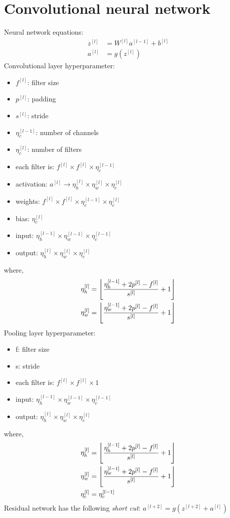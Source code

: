 \documentclass{book}
\DeclarePairedDelimiter\floor{\lfloor}{\rfloor}
\begin{document}
\chapter{Convolutional neural network}
Neural network equations:
\begin{align*}
z^{[l]} &= W^{[l]}a^{[l-1]} + b^{[l]} \\
a^{[l]} &= g(z^{[l]})
\end{align*}
Convolutional layer hyperparameter:
\begin{itemize}\addtolength{\itemsep}{-0.5\baselineskip}
\item $f^{[l]}$: filter size
\item $p^{[l]}$: padding
\item $s^{[l]}$: stride
\item $\eta_c^{[l-1]}$: number of channels
\item $\eta_c^{[l]}$: number of filters
\item each filter is: $f^{[l]} \times f^{[l]} \times \eta_c^{[l-1]}$
\item activation: $a^{[l]} \rightarrow \eta_h^{[l]} \times \eta_w^{[l]} \times \eta_c^{[l]}$
\item weights: $f^{[l]} \times f^{[l]} \times \eta_c^{[l-1]} \times \eta_c^{[l]}$
\item bias: $\eta_c^{[l]}$
\item input: $\eta_h^{[l-1]} \times \eta_w^{[l-1]} \times \eta_c^{[l-1]}$
\item output: $\eta_h^{[l]} \times \eta_w^{[l]} \times \eta_c^{[l]}$
\end{itemize}
where,
\begin{align*}
\eta_h^{[l]} &= \floor*{\frac{\eta_h^{[l-1]} + 2p^{[l]} - f^{[l]}}{s^{[l]}} + 1} \\
\eta_w^{[l]} &= \floor*{\frac{\eta_w^{[l-1]} + 2p^{[l]} - f^{[l]}}{s^{[l]}} + 1}
\end{align*}
Pooling layer hyperparameter:
\begin{itemize}\addtolength{\itemsep}{-0.5\baselineskip}
\item f: filter size
\item s: stride
\item each filter is: $f^{[l]} \times f^{[l]} \times 1$
\item input: $\eta_h^{[l-1]} \times \eta_w^{[l-1]} \times \eta_c^{[l-1]}$
\item output: $\eta_h^{[l]} \times \eta_w^{[l]} \times \eta_c^{[l]}$
\end{itemize}
where,
\begin{align*}
\eta_h^{[l]} &= \floor*{\frac{\eta_h^{[l-1]} + 2p^{[l]} - f^{[l]}}{s^{[l]}} + 1} \\
\eta_w^{[l]} &= \floor*{\frac{\eta_w^{[l-1]} + 2p^{[l]} - f^{[l]}}{s^{[l]}} + 1} \\
\eta_c^{[l]} &= \eta_c^{[l-1]}
\end{align*}
Residual network has the following \emph{short cut}: $a^{[l+2]} = g(z^{[l+2]} + a^{[l]})$
\end{document}
